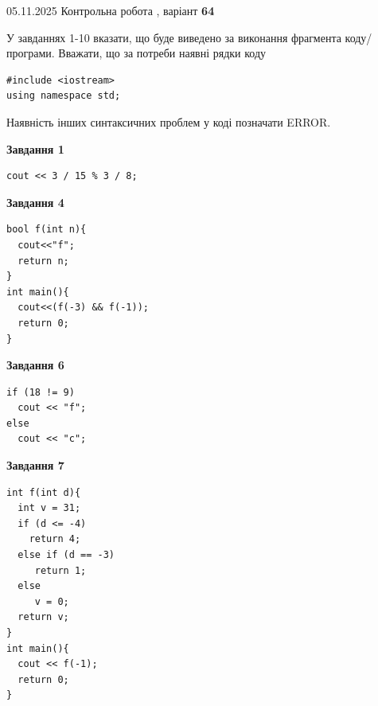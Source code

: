 \documentclass[12pt, ukrainian]{article}
\begin{document}
\newpage

{\Large{05.11.2025 Контрольна робота , варіант  \No \textbf { 64 }\par}}
{
\begin {large}
У завданнях 1-10 вказати, що буде виведено за виконання фрагмента коду/про\-гра\-ми.
Вважати, що за потреби наявні рядки коду
\begin{verbatim}
#include <iostream>
using namespace std;
\end{verbatim}
Наявність інших синтаксичних проблем у коді позначати ERROR.

\begin{minipage}[t]{7.0cm}

\begin{center}
\textbf{Завдання 1}
\end{center}
\vspace{-8mm}

\begin{verbatim}
cout << 3 / 15 % 3 / 8;
\end{verbatim}



\begin{center}
\textbf{Завдання 4}
\end{center}
\vspace{-8mm}

\begin{verbatim}
bool f(int n){
  cout<<"f";
  return n;
}
int main(){
  cout<<(f(-3) && f(-1));
  return 0;
}
\end{verbatim}



\begin{center}
\textbf{Завдання 6}
\end{center}
\vspace{-8mm}

\begin{verbatim}
if (18 != 9)
  cout << "f";
else
  cout << "c";
\end{verbatim}



\begin{center}
\textbf{Завдання 7}
\end{center}
\vspace{-8mm}

\begin{verbatim}
int f(int d){
  int v = 31;
  if (d <= -4)
    return 4;
  else if (d == -3)
     return 1;
  else
     v = 0;
  return v;
}
int main(){
  cout << f(-1);
  return 0;
}
\end{verbatim}


\end{minipage}
\end{large}}
\end{document}

